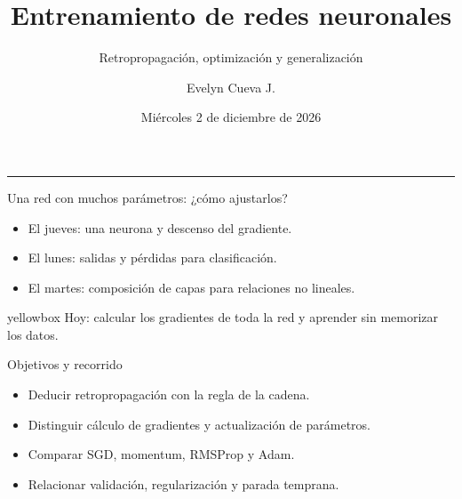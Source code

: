 \documentclass[10pt,aspectratio=169,xcolor={dvipsnames}]{beamer}
\title[Clase 15]{\bfseries Entrenamiento de redes neuronales}
\subtitle{Retropropagación, optimización y generalización}
\author[E. Cueva]{Evelyn Cueva J.}
\institute{Aprendizaje Automático Inicial · Ciencia de Datos}
\date[2 dic. 2026]{Miércoles 2 de diciembre de 2026}
\newenvironment{caja}[1][lgraybox]{\begin{beamercolorbox}[sep=0.7em,wd=\linewidth]{#1}}{\end{beamercolorbox}}
\begin{document}
\begin{frame}[plain]
    \vspace{6mm}{\small CLASE 15\par}\vspace{6mm}
    {\LARGE\bfseries\inserttitle\par}\vspace{3mm}
    {\color{fondo}\rule{0.92\textwidth}{1pt}}\par
    {\large\insertsubtitle\par}\vspace{8mm}
    \insertauthor\par\smallskip{\small\insertinstitute\par}\vspace{3mm}
    {\small\insertdate\par}\vfill
\end{frame}
\begin{frame}{Una red con muchos parámetros: ¿cómo ajustarlos?}
\begin{itemize}
\item El jueves: una neurona y descenso del gradiente.
\item El lunes: salidas y pérdidas para clasificación.
\item El martes: composición de capas para relaciones no lineales.
\end{itemize}\begin{caja}[yellowbox]
Hoy: calcular los gradientes de toda la red y aprender sin memorizar los datos.
\end{caja}

\note{}
\end{frame}

\begin{frame}{Objetivos y recorrido}
\begin{itemize}
\item Deducir retropropagación con la regla de la cadena.
\item Distinguir cálculo de gradientes y actualización de parámetros.
\item Comparar SGD, momentum, RMSProp y Adam.
\item Relacionar validación, regularización y parada temprana.
\end{itemize}
\note{}
\end{frame}
\end{document}
